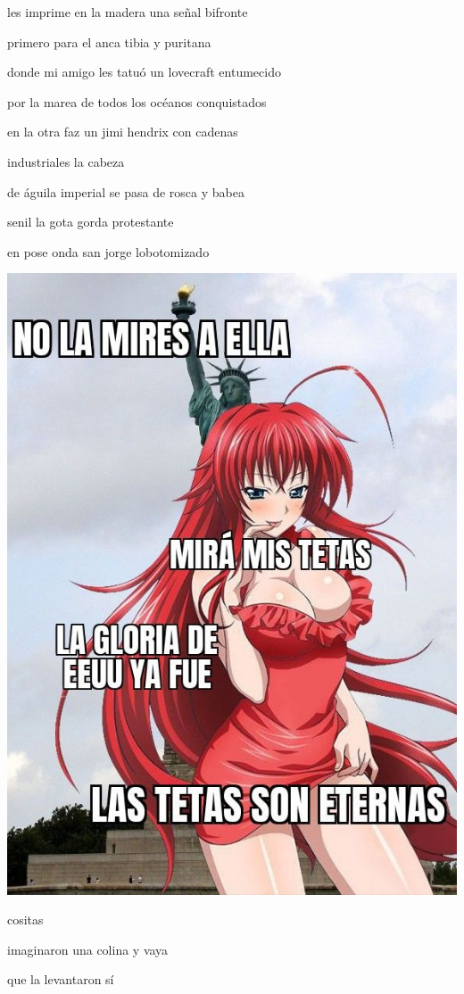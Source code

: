 \documentclass[
]{book}
\begin{document}
les imprime en la madera una señal bifronte

primero para el anca tibia y puritana

donde mi amigo les tatuó un lovecraft entumecido

por la marea de todos los océanos conquistados

en la otra faz un jimi hendrix con cadenas

industriales la cabeza

de águila imperial se pasa de rosca y babea

senil la gota gorda protestante

en pose onda san jorge lobotomizado

\includegraphics{images/13.png}

cositas

imaginaron una colina y vaya

que la levantaron sí
\end{document}
